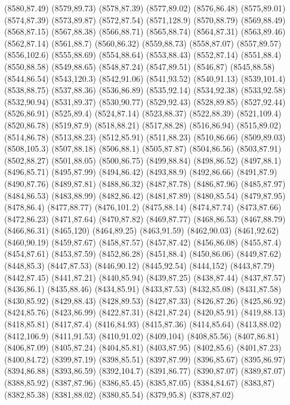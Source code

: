 (8580,87.49)
(8579,89.73)
(8578,87.39)
(8577,89.02)
(8576,86.48)
(8575,89.01)
(8574,87.39)
(8573,89.87)
(8572,87.54)
(8571,128.9)
(8570,88.79)
(8569,88.49)
(8568,87.15)
(8567,88.38)
(8566,88.71)
(8565,88.74)
(8564,87.31)
(8563,89.46)
(8562,87.14)
(8561,88.7)
(8560,86.32)
(8559,88.73)
(8558,87.07)
(8557,89.57)
(8556,102.6)
(8555,88.69)
(8554,88.64)
(8553,88.43)
(8552,87.14)
(8551,88.4)
(8550,88.58)
(8549,88.65)
(8548,87.24)
(8547,89.51)
(8546,87)
(8545,88.58)
(8544,86.54)
(8543,120.3)
(8542,91.06)
(8541,93.52)
(8540,91.13)
(8539,101.4)
(8538,88.75)
(8537,88.36)
(8536,86.89)
(8535,92.14)
(8534,92.38)
(8533,92.58)
(8532,90.94)
(8531,89.37)
(8530,90.77)
(8529,92.43)
(8528,89.85)
(8527,92.44)
(8526,86.91)
(8525,89.4)
(8524,87.14)
(8523,88.37)
(8522,88.39)
(8521,109.4)
(8520,86.78)
(8519,87.9)
(8518,88.21)
(8517,88.28)
(8516,86.94)
(8515,89.02)
(8514,86.78)
(8513,88.23)
(8512,85.91)
(8511,88.23)
(8510,86.66)
(8509,89.03)
(8508,105.3)
(8507,88.18)
(8506,88.1)
(8505,87.87)
(8504,86.56)
(8503,87.91)
(8502,88.27)
(8501,88.05)
(8500,86.75)
(8499,88.84)
(8498,86.52)
(8497,88.1)
(8496,85.71)
(8495,87.99)
(8494,86.42)
(8493,88.9)
(8492,86.66)
(8491,87.9)
(8490,87.76)
(8489,87.81)
(8488,86.32)
(8487,87.78)
(8486,87.96)
(8485,87.97)
(8484,86.53)
(8483,88.99)
(8482,86.42)
(8481,87.89)
(8480,85.54)
(8479,87.95)
(8478,86.4)
(8477,88.77)
(8476,101.2)
(8475,88.14)
(8474,87.74)
(8473,87.66)
(8472,86.23)
(8471,87.64)
(8470,87.82)
(8469,87.77)
(8468,86.53)
(8467,88.79)
(8466,86.31)
(8465,120)
(8464,89.25)
(8463,91.59)
(8462,90.03)
(8461,92.62)
(8460,90.19)
(8459,87.67)
(8458,87.57)
(8457,87.42)
(8456,86.08)
(8455,87.4)
(8454,87.61)
(8453,87.59)
(8452,86.28)
(8451,88.4)
(8450,86.06)
(8449,87.62)
(8448,85.3)
(8447,87.53)
(8446,90.12)
(8445,92.54)
(8444,152)
(8443,87.79)
(8442,87.45)
(8441,87.21)
(8440,85.94)
(8439,87.25)
(8438,87.44)
(8437,87.57)
(8436,86.1)
(8435,88.46)
(8434,85.91)
(8433,87.53)
(8432,85.08)
(8431,87.58)
(8430,85.92)
(8429,88.43)
(8428,89.53)
(8427,87.33)
(8426,87.26)
(8425,86.92)
(8424,85.76)
(8423,86.99)
(8422,87.31)
(8421,87.24)
(8420,85.91)
(8419,88.13)
(8418,85.81)
(8417,87.4)
(8416,84.93)
(8415,87.36)
(8414,85.64)
(8413,88.02)
(8412,106.9)
(8411,91.53)
(8410,91.02)
(8409,104)
(8408,85.56)
(8407,86.81)
(8406,87.09)
(8405,87.24)
(8404,85.81)
(8403,87.95)
(8402,85.6)
(8401,87.23)
(8400,84.72)
(8399,87.19)
(8398,85.51)
(8397,87.99)
(8396,85.67)
(8395,86.97)
(8394,86.88)
(8393,86.59)
(8392,104.7)
(8391,86.77)
(8390,87.07)
(8389,87.07)
(8388,85.92)
(8387,87.96)
(8386,85.45)
(8385,87.05)
(8384,84.67)
(8383,87)
(8382,85.38)
(8381,88.02)
(8380,85.54)
(8379,95.8)
(8378,87.02)
